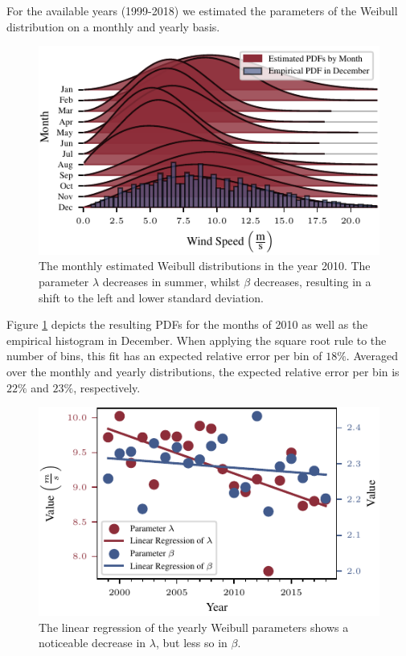 \documentclass{article}
\theoremstyle{plain}
\theoremstyle{definition}
\theoremstyle{remark}
\begin{document}
For the available years (1999-2018) we estimated the parameters of the Weibull distribution on a monthly and yearly basis. 
\begin{figure}
    \centering 
    \includegraphics{fig/monthly_weibull.pdf}
    \caption{The monthly estimated Weibull distributions in the year 2010. The parameter $\lambda$ decreases in summer, whilst $\beta$ decreases, resulting in a shift to the left and lower standard deviation.}
    \label{fig:monthly_weibull}
\end{figure}
Figure \ref{fig:monthly_weibull} depicts the resulting PDFs for the months of 2010 as well 
as the empirical histogram in December.
When applying the square root rule to the number of bins,
 this fit has an expected relative error per bin of $18 \%$. 
 Averaged over the monthly and yearly distributions,
 the expected relative error per bin is  $22 \%$ and $23 \%$, respectively.

\begin{figure}
    \centering
    \includegraphics{fig/linreg_parameters.pdf}
    \caption{The linear regression of the yearly Weibull parameters shows a noticeable decrease in 
 \textcolor{TUred}{$\lambda$}, but less so in \textcolor{TUdarkblue}{$\beta$}.}
    \label{fig:lin_reg}
\end{figure}
\end{document}
